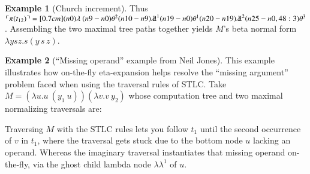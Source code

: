 \documentclass{elsarticle}
\theoremstyle{plain}
\theoremstyle{definition}
\newtheorem{example}{Example}[section]
\theoremstyle{remark}
\newcommand{\ghostlmd}{{\lambda\!\!\lambda}}
\newcommand{\ghostvar}{\theta}
\def\coresymbol{\pi} %
\newcommand{\core}[1]{\coresymbol(#1)} %
\begin{document}
\begin{example}[Church increment]
Thus $\pview{\core{t_{12}}} =
\Pstr[0.7cm]{
(n0){\lambda }\
 (n9-n0){{\ghostvar^2}}
 (n10-n9){\ghostlmd^1}
(n19-n0){\ghostvar^1}
(n20-n19){\ghostlmd^2}
(n25-n0,48:3) {\ghostvar^3}
}$.
Assembling the two maximal tree paths together yields $M$'s beta normal form $\lambda y s z . s(y\, s\, z)$.
\end{example}

\begin{example}[``Missing operand'' example from Neil Jones]
\label{ex:missingoperand}
This example illustrates how on-the-fly eta-expansion helps resolve the ``missing argument'' problem faced when using the traversal rules of STLC. Take $M = (\lambda u . u\ (y_1\ u)) (\lambda v . v\ y_2)$ whose computation tree  and two maximal normalizing traversals are:


Traversing $M$ with the STLC rules lets you follow $t_1$ until the second occurrence of $v$ in $t_1$, where the traversal gets stuck due to the bottom node $u$ lacking an operand. Whereas the imaginary traversal instantiates that missing operand on-the-fly, via the ghost child lambda node $\ghostlmd^1$ of $u$.


\end{example}
\end{document}

